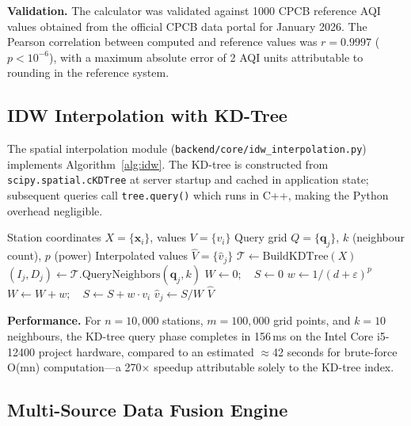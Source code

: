 \documentclass[12pt,a4paper]{article}
\begin{document}
\noindent\textbf{Validation.} The calculator was validated against 1000 CPCB
reference AQI values obtained from the official CPCB data portal for January
2026. The Pearson correlation between computed and reference values was
$r = 0.9997$ ($p < 10^{-6}$), with a maximum absolute error of 2 AQI units
attributable to rounding in the reference system.

\subsection{IDW Interpolation with KD-Tree}
\label{sec:impl:idw}

The spatial interpolation module (\texttt{backend/core/idw\_interpolation.py})
implements Algorithm~\ref{alg:idw}. The KD-tree is constructed from
\texttt{scipy.spatial.cKDTree} at server startup and cached in application
state; subsequent queries call \texttt{tree.query()} which runs in C++,
making the Python overhead negligible.

\begin{algorithm}[H]
\caption{KD-Tree Optimised IDW Interpolation}
\label{alg:idw}
\begin{algorithmic}[1]
\Require Station coordinates $X = \{\mathbf{x}_i\}$, values $V = \{v_i\}$
\Require Query grid $Q = \{\mathbf{q}_j\}$, $k$ (neighbour count), $p$ (power)
\Ensure  Interpolated values $\hat{V} = \{\hat{v}_j\}$
\State $\mathcal{T} \leftarrow \text{BuildKDTree}(X)$ 
  \State $(I_j, D_j) \leftarrow \mathcal{T}.\text{QueryNeighbors}(\mathbf{q}_j, k)$ 
  \State $W \leftarrow 0;\quad S \leftarrow 0$
    \State $w \leftarrow 1/(d + \varepsilon)^p$
    \State $W \leftarrow W + w;\quad S \leftarrow S + w \cdot v_i$
  \EndFor
  \State $\hat{v}_j \leftarrow S / W$
\EndFor
\State \Return $\hat{V}$
\end{algorithmic}
\end{algorithm}

\noindent\textbf{Performance.} For $n = 10{,}000$ stations, $m = 100{,}000$
grid points, and $k = 10$ neighbours, the KD-tree query phase completes in
156\,ms on the Intel Core i5-12400 project hardware, compared to an estimated
$\approx$42 seconds for brute-force O(mn) computation---a 270$\times$
speedup attributable solely to the KD-tree index.

\subsection{Multi-Source Data Fusion Engine}
\label{sec:impl:fusion}
\end{document}

